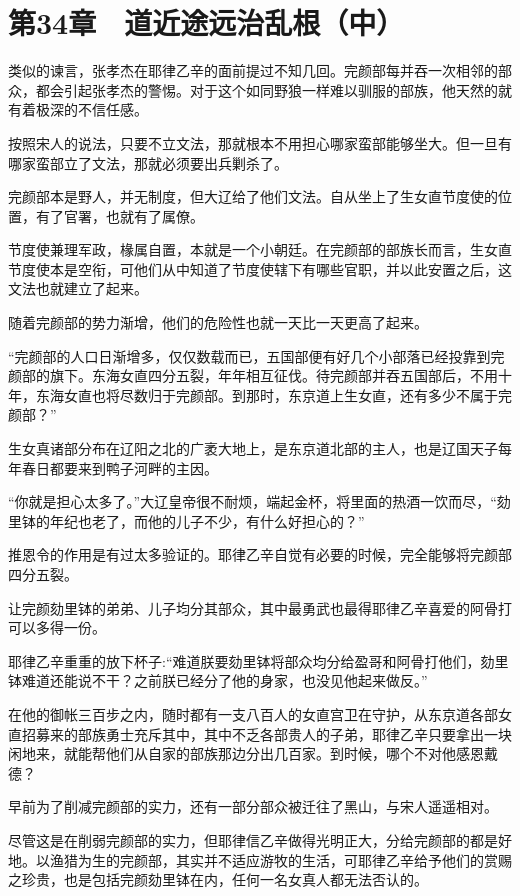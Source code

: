 \section{第34章　道近途远治乱根（中）}

类似的谏言，张孝杰在耶律乙辛的面前提过不知几回。完颜部每并吞一次相邻的部众，都会引起张孝杰的警惕。对于这个如同野狼一样难以驯服的部族，他天然的就有着极深的不信任感。

按照宋人的说法，只要不立文法，那就根本不用担心哪家蛮部能够坐大。但一旦有哪家蛮部立了文法，那就必须要出兵剿杀了。

完颜部本是野人，并无制度，但大辽给了他们文法。自从坐上了生女直节度使的位置，有了官署，也就有了属僚。

节度使兼理军政，椽属自置，本就是一个小朝廷。在完颜部的部族长而言，生女直节度使本是空衔，可他们从中知道了节度使辖下有哪些官职，并以此安置之后，这文法也就建立了起来。

随着完颜部的势力渐增，他们的危险性也就一天比一天更高了起来。

“完颜部的人口日渐增多，仅仅数载而已，五国部便有好几个小部落已经投靠到完颜部的旗下。东海女直四分五裂，年年相互征伐。待完颜部并吞五国部后，不用十年，东海女直也将尽数归于完颜部。到那时，东京道上生女直，还有多少不属于完颜部？”

生女真诸部分布在辽阳之北的广袤大地上，是东京道北部的主人，也是辽国天子每年春日都要来到鸭子河畔的主因。

“你就是担心太多了。”大辽皇帝很不耐烦，端起金杯，将里面的热酒一饮而尽，“劾里钵的年纪也老了，而他的儿子不少，有什么好担心的？”

推恩令的作用是有过太多验证的。耶律乙辛自觉有必要的时候，完全能够将完颜部四分五裂。

让完颜劾里钵的弟弟、儿子均分其部众，其中最勇武也最得耶律乙辛喜爱的阿骨打可以多得一份。

耶律乙辛重重的放下杯子:“难道朕要劾里钵将部众均分给盈哥和阿骨打他们，劾里钵难道还能说不干？之前朕已经分了他的身家，也没见他起来做反。”

在他的御帐三百步之内，随时都有一支八百人的女直宫卫在守护，从东京道各部女直招募来的部族勇士充斥其中，其中不乏各部贵人的子弟，耶律乙辛只要拿出一块闲地来，就能帮他们从自家的部族那边分出几百家。到时候，哪个不对他感恩戴德？

早前为了削减完颜部的实力，还有一部分部众被迁往了黑山，与宋人遥遥相对。

尽管这是在削弱完颜部的实力，但耶律信乙辛做得光明正大，分给完颜部的都是好地。以渔猎为生的完颜部，其实并不适应游牧的生活，可耶律乙辛给予他们的赏赐之珍贵，也是包括完颜劾里钵在内，任何一名女真人都无法否认的。

